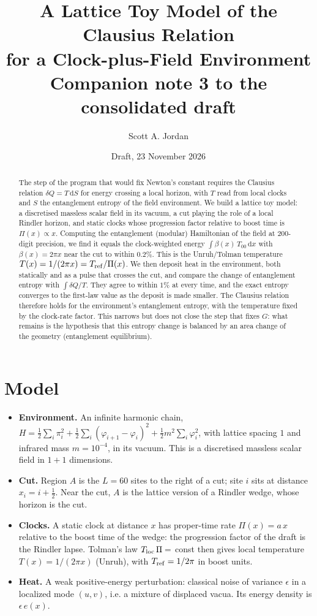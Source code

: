 \documentclass[11pt]{article}
\title{A Lattice Toy Model of the Clausius Relation\\ for a Clock-plus-Field Environment\\[4pt]
\large Companion note 3 to the consolidated draft}
\author{Scott A. Jordan}
\date{Draft, 23 November 2026}
\newcommand{\Pg}{\Pi}
\newcommand{\dd}{\mathrm{d}}
\begin{document}
\maketitle

\begin{abstract}
The step of the program that would fix Newton's constant requires the Clausius relation $\delta Q=T\,\dd S$ for energy crossing a local horizon, with $T$ read from local clocks and $S$ the entanglement entropy of the field environment. We build a lattice toy model: a discretised massless scalar field in its vacuum, a cut playing the role of a local Rindler horizon, and static clocks whose progression factor relative to boost time is $\Pg(x)\propto x$. Computing the entanglement (modular) Hamiltonian of the field at 200-digit precision, we find it equals the clock-weighted energy $\int\beta(x)\,T_{00}\,\dd x$ with $\beta(x)=2\pi x$ near the cut to within $0.2\%$. This is the Unruh/Tolman temperature $T(x)=1/(2\pi x)=T_{\rm ref}/\Pg(x)$. We then deposit heat in the environment, both statically and as a pulse that crosses the cut, and compare the change of entanglement entropy with $\int\delta Q/T$. They agree to within $1\%$ at every time, and the exact entropy converges to the first-law value as the deposit is made smaller. The Clausius relation therefore holds for the environment's entanglement entropy, with the temperature fixed by the clock-rate factor. This narrows but does not close the step that fixes $G$: what remains is the hypothesis that this entropy change is balanced by an area change of the geometry (entanglement equilibrium).
\end{abstract}

\section{Model}

\begin{itemize}
\item \textbf{Environment.} An infinite harmonic chain, $H=\tfrac12\sum_i\pi_i^2+\tfrac12\sum_i(\varphi_{i+1}-\varphi_i)^2+\tfrac12m^2\sum_i\varphi_i^2$, with lattice spacing $1$ and infrared mass $m=10^{-4}$, in its vacuum. This is a discretised massless scalar field in $1+1$ dimensions.
\item \textbf{Cut.} Region $A$ is the $L=60$ sites to the right of a cut; site $i$ sits at distance $x_i=i+\tfrac12$. Near the cut, $A$ is the lattice version of a Rindler wedge, whose horizon is the cut.
\item \textbf{Clocks.} A static clock at distance $x$ has proper-time rate $\Pg(x)=a\,x$ relative to the boost time of the wedge: the progression factor of the draft is the Rindler lapse. Tolman's law $T_{\rm loc}\,\Pg=$ const then gives local temperature $T(x)=1/(2\pi x)$ (Unruh), with $T_{\rm ref}=1/2\pi$ in boost units.
\item \textbf{Heat.} A weak positive-energy perturbation: classical noise of variance $\epsilon$ in a localized mode $(u,v)$, i.e. a mixture of displaced vacua. Its energy density is $\epsilon\,e(x)$.
\end{itemize}
\end{document}
